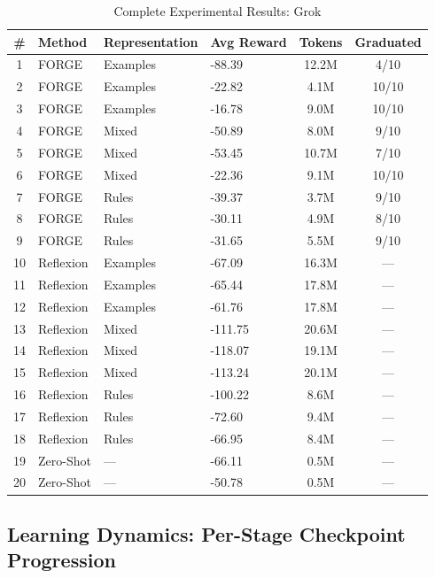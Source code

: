 \documentclass[sigconf]{acmart}
\begin{document}
\begin{table}[htbp]
\centering
\scriptsize
\caption{Complete Experimental Results: Grok}
\label{tab:full-results-grok}
\begin{tabular}{clllcc}
\toprule
\textbf{\#} & \textbf{Method} & \textbf{Representation} & \textbf{Avg Reward} & \textbf{Tokens} & \textbf{Graduated} \\
\midrule
1 & FORGE & Examples & -88.39 & 12.2M & 4/10 \\
2 & FORGE & Examples & -22.82 & 4.1M & 10/10 \\
3 & FORGE & Examples & -16.78 & 9.0M & 10/10 \\
4 & FORGE & Mixed & -50.89 & 8.0M & 9/10 \\
5 & FORGE & Mixed & -53.45 & 10.7M & 7/10 \\
6 & FORGE & Mixed & -22.36 & 9.1M & 10/10 \\
7 & FORGE & Rules & -39.37 & 3.7M & 9/10 \\
8 & FORGE & Rules & -30.11 & 4.9M & 8/10 \\
9 & FORGE & Rules & -31.65 & 5.5M & 9/10 \\
\midrule
10 & Reflexion & Examples & -67.09 & 16.3M & --- \\
11 & Reflexion & Examples & -65.44 & 17.8M & --- \\
12 & Reflexion & Examples & -61.76 & 17.8M & --- \\
13 & Reflexion & Mixed & -111.75 & 20.6M & --- \\
14 & Reflexion & Mixed & -118.07 & 19.1M & --- \\
15 & Reflexion & Mixed & -113.24 & 20.1M & --- \\
16 & Reflexion & Rules & -100.22 & 8.6M & --- \\
17 & Reflexion & Rules & -72.60 & 9.4M & --- \\
18 & Reflexion & Rules & -66.95 & 8.4M & --- \\
\midrule
19 & Zero-Shot & --- & -66.11 & 0.5M & --- \\
20 & Zero-Shot & --- & -50.78 & 0.5M & --- \\
\bottomrule
\end{tabular}
\end{table}

\subsection{Learning Dynamics: Per-Stage Checkpoint Progression}
\label{app:stage-progression}
\end{document}
